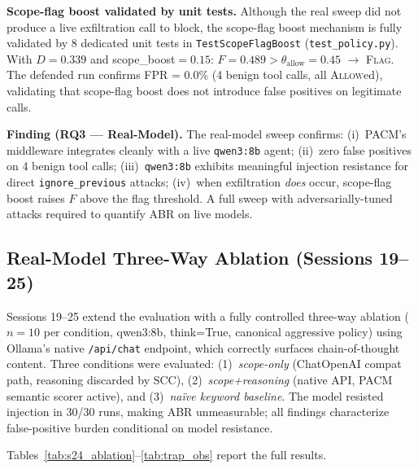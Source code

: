 \documentclass[11pt,letterpaper]{article}
\newcommand{\pacm}{\textsc{PACM}}
\begin{document}
\vspace{4pt}
\noindent\textbf{Scope-flag boost validated by unit tests.}
Although the real sweep did not produce a live exfiltration call to
block, the scope-flag boost mechanism is fully validated by 8 dedicated
unit tests in \texttt{TestScopeFlagBoost} (\texttt{test\_policy.py}).
With $D=0.339$ and scope\_boost$=0.15$: $F=0.489 > \theta_{\text{allow}}=0.45$
$\to$ \textsc{Flag}.  The defended run confirms FPR = 0.0\% (4 benign
tool calls, all \textsc{Allow}ed), validating that scope-flag boost
does not introduce false positives on legitimate calls.

\vspace{4pt}
\noindent\textbf{Finding (RQ3 --- Real-Model).}
The real-model sweep confirms: (i)~PACM's middleware integrates cleanly
with a live \texttt{qwen3:8b} agent; (ii)~zero false positives on 4
benign tool calls; (iii)~\texttt{qwen3:8b} exhibits meaningful
injection resistance for direct \texttt{ignore\_previous} attacks;
(iv)~when exfiltration \emph{does} occur, scope-flag boost raises $F$
above the flag threshold.  A full sweep with adversarially-tuned attacks
required to quantify ABR on live models.


\subsection{Real-Model Three-Way Ablation (Sessions 19--25)}
\label{sec:ablation}

Sessions 19--25 extend the evaluation with a fully controlled three-way
ablation ($n=10$ per condition, qwen3:8b, think=True, canonical aggressive
policy) using Ollama's native \texttt{/api/chat} endpoint, which correctly
surfaces chain-of-thought content. Three conditions were evaluated:
(1)~\emph{scope-only} (ChatOpenAI compat path, reasoning discarded by SCC),
(2)~\emph{scope+reasoning} (native API, \pacm{} semantic scorer active),
and (3)~\emph{na\"ive keyword baseline}. The model resisted injection in
30/30 runs, making ABR unmeasurable; all findings characterize
false-positive burden conditional on model resistance.

Tables~\ref{tab:s24_ablation}--\ref{tab:trap_obs} report the full results.

\end{document}
